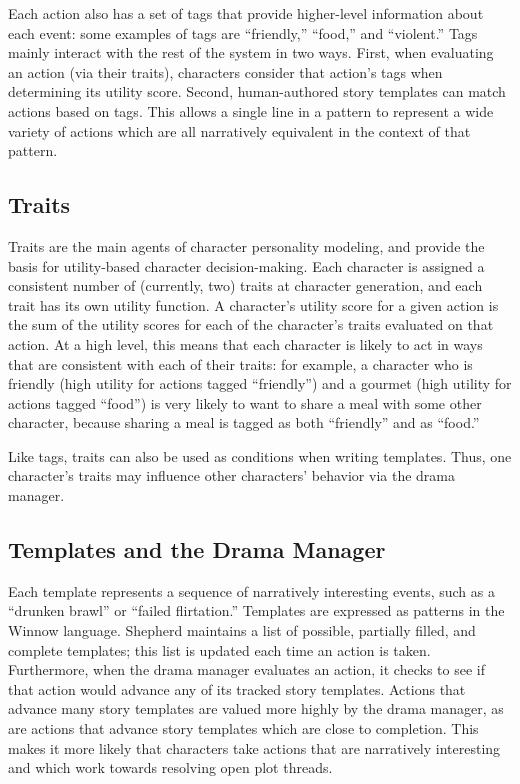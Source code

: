 \documentclass[letterpaper]{article}
\begin{document}
Each action also has a set of tags that provide higher-level information about each event:
some examples of tags are ``friendly,'' ``food,'' and ``violent.'' Tags mainly interact
with the rest of the system in two ways. First, when evaluating an action (via their
traits), characters consider that action's tags when determining its utility score.
Second, human-authored story templates can match actions based on tags. This allows a
single line in a pattern to represent a wide variety of actions which are all narratively
equivalent in the context of that pattern.

\subsection{Traits}
Traits are the main agents of character personality modeling, and provide the basis for
utility-based character decision-making. Each character is assigned a consistent number of
(currently, two) traits at character generation, and each trait has its own utility
function. A character's utility score for a given action is the sum of the utility scores
for each of the character's traits evaluated on that action. At a high level, this means
that each character is likely to act in ways that are consistent with each of their
traits: for example, a character who is friendly (high utility for actions tagged
``friendly'') and a gourmet (high utility for actions tagged ``food'') is very likely to want to
share a meal with some other character, because sharing a meal is tagged as both
``friendly'' and as ``food.'' 

Like tags, traits can also be used as conditions when writing templates. Thus, one
character's traits may influence other characters' behavior via the drama manager.

\subsection{Templates and the Drama Manager}
Each template represents a sequence of narratively interesting events, such as a ``drunken
brawl'' or ``failed flirtation.'' Templates are expressed as patterns in the Winnow
language. Shepherd maintains a list of possible, partially filled, and complete templates;
this list is updated each time an action is taken. Furthermore, when the drama manager
evaluates an action, it checks to see if that action would advance any of its tracked
story templates. Actions that advance many story templates are valued more highly by the
drama manager, as are actions that advance story templates which are close to completion.
This makes it more likely that characters take actions that are narratively interesting
and which work towards resolving open plot threads.
\end{document}
